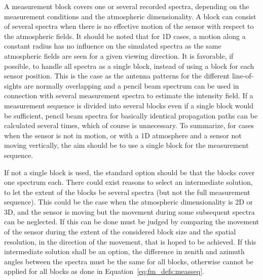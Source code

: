 A measurement block covers one or several recorded spectra, depending
on the measurement conditions and the atmospheric dimensionality. A
block can consist of several spectra when there is no effective
motion of the sensor with respect to the atmospheric fields. It should
be noted that for 1D cases, a motion along a constant radius has no
influence on the simulated spectra as the same atmospheric fields are
seen for a given viewing direction. It is favorable, if possible, to
handle all spectra as a single block, instead of using a block for
each sensor position. This is the case as the antenna patterns for the
different line-of-sights are normally overlapping and a pencil beam
spectrum can be used in connection with several measurement spectra to
estimate the intensity field. If a measurement sequence is divided
into several blocks even if a single block would be sufficient, pencil
beam spectra for basically identical propagation paths can be
calculated several times, which of course is unnecessary. To
summarize, for cases when the sensor is not in motion, or with a 1D
atmosphere and a sensor not moving vertically, the aim should be to
use a single block for the measurement sequence.

If not a single block is used, the standard option should be that the
blocks cover one spectrum each. There could exist reasons to select an
intermediate solution, to let the extent of the blocks be several
spectra (but not the full measurement sequence). This could be the
case when the atmospheric dimensionality is 2D or 3D, and the sensor
is moving but the movement during some subsequent spectra can be
neglected. If this can be done must be judged by comparing the
movement of the sensor during the extent of the considered block
size and the spatial resolution, in the direction of the movement, that
is hoped to be achieved. If this intermediate solution shall be an
option, the difference in zenith and azimuth angles between the
spectra must be the same for all blocks, otherwise  cannot
be applied for all blocks as done in Equation~\ref{eq:fm_defs:measseq}.

